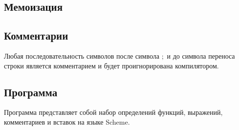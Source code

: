     \subsection{Мемоизация}

    \subsection{Комментарии}
        Любая последовательность символов после символа $;$ и до символа переноса строки является комментарием и будет проигнорирована компилятором.

        

    \subsection{Программа}
        Программа представляет собой набор определений функций, выражений, комментариев и вставок на языке Scheme.

        
